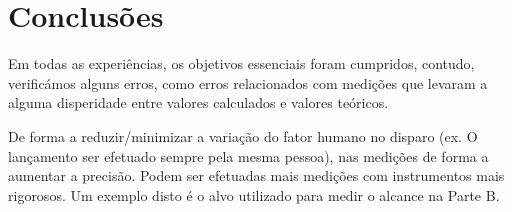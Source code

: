 
\chapter{Conclusões}
\label{ch:conclusoes}
{

Em todas as experiências, os objetivos essenciais foram cumpridos, contudo, verificámos alguns erros, como erros relacionados com medições que levaram a alguma disperidade entre valores calculados e valores teóricos.

De forma a reduzir/minimizar a variação do fator humano no disparo (ex. O lançamento ser efetuado sempre pela mesma pessoa), nas medições de forma a aumentar a precisão. Podem ser efetuadas mais medições com instrumentos mais rigorosos. Um exemplo disto é o alvo utilizado para medir o alcance na Parte B.

}
